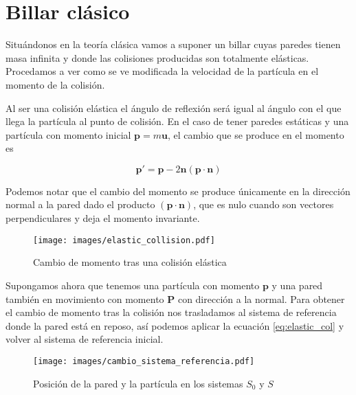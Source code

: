 \documentclass[11pt, spanish]{book}
\begin{document}
\section{Billar clásico}

Situándonos en la teoría clásica vamos a suponer un billar cuyas paredes tienen masa infinita y donde las colisiones producidas son totalmente elásticas. Procedamos a ver como se ve modificada la velocidad de la partícula en el momento de la colisión.

\vspace{3mm}

Al ser una colisión elástica el ángulo de reflexión será igual al ángulo con el que llega la partícula al punto de colisión. En el caso de tener paredes estáticas y una partícula con momento inicial \( \mathbf{p} = m\mathbf{u}\), el cambio que se produce en el momento es 

\begin{equation}
    \mathbf{p}' = \mathbf{p} - 2\mathbf{n}(\mathbf{p} \cdot \mathbf{n})
    \label{eq:elastic_col}
\end{equation}

Podemos notar que el cambio del momento se produce únicamente en la dirección normal a la pared dado el producto \( (\mathbf{p} \cdot \mathbf{n}) \), que es nulo cuando son vectores perpendiculares y deja el momento invariante.

\begin{figure}[H]
    \centering
    \texttt{[image: images/elastic\_collision.pdf]}
    \caption{Cambio de momento tras una colisión elástica}
    \label{fig:elastic_col}
\end{figure}

\vspace{3mm}

Supongamos ahora que tenemos una partícula con momento \( \mathbf{p} \) y una pared también en movimiento con momento \( \mathbf{P} \) con dirección a la normal. Para obtener el cambio de momento tras la colisión nos trasladamos al sistema de referencia donde la pared está en reposo, así podemos aplicar la ecuación \ref{eq:elastic_col} y volver al sistema de referencia inicial.

\begin{figure}[H]
    \centering
    \texttt{[image: images/cambio\_sistema\_referencia.pdf]}
    \caption{Posición de la pared y la partícula en los sistemas $S_0$ y $S$}
    \label{fig:cambio_referencia}
\end{figure}
\end{document}
